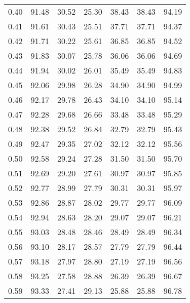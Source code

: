 \begin{tabular}{|c|c|c|c|c|c|c|}
      0.40 &     91.48 &     30.52 &      25.30 &   38.43 &      38.43 &         94.19 \\
      0.41 &     91.61 &     30.43 &      25.51 &   37.71 &      37.71 &         94.37 \\
      0.42 &     91.71 &     30.22 &      25.61 &   36.85 &      36.85 &         94.52 \\
      0.43 &     91.83 &     30.07 &      25.78 &   36.06 &      36.06 &         94.69 \\
      0.44 &     91.94 &     30.02 &      26.01 &   35.49 &      35.49 &         94.83 \\
      0.45 &     92.06 &     29.98 &      26.28 &   34.90 &      34.90 &         94.99 \\
      0.46 &     92.17 &     29.78 &      26.43 &   34.10 &      34.10 &         95.14 \\
      0.47 &     92.28 &     29.68 &      26.66 &   33.48 &      33.48 &         95.29 \\
      0.48 &     92.38 &     29.52 &      26.84 &   32.79 &      32.79 &         95.43 \\
      0.49 &     92.47 &     29.35 &      27.02 &   32.12 &      32.12 &         95.56 \\
      0.50 &     92.58 &     29.24 &      27.28 &   31.50 &      31.50 &         95.70 \\
      0.51 &     92.69 &     29.20 &      27.61 &   30.97 &      30.97 &         95.85 \\
      0.52 &     92.77 &     28.99 &      27.79 &   30.31 &      30.31 &         95.97 \\
      0.53 &     92.86 &     28.87 &      28.02 &   29.77 &      29.77 &         96.09 \\
      0.54 &     92.94 &     28.63 &      28.20 &   29.07 &      29.07 &         96.21 \\
      0.55 &     93.03 &     28.48 &      28.46 &   28.49 &      28.49 &         96.34 \\
      0.56 &     93.10 &     28.17 &      28.57 &   27.79 &      27.79 &         96.44 \\
      0.57 &     93.18 &     27.97 &      28.80 &   27.19 &      27.19 &         96.56 \\
      0.58 &     93.25 &     27.58 &      28.88 &   26.39 &      26.39 &         96.67 \\
      0.59 &     93.33 &     27.41 &      29.13 &   25.88 &      25.88 &         96.78 \\

\end{tabular}
